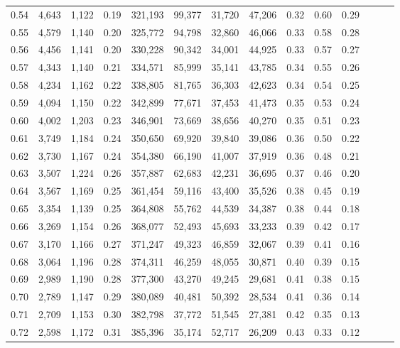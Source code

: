 \begin{tabular}{rrrrrrrrrrrrrr}
0.54 &  4,643 &  1,122 &  0.19 &  321,193 &   99,377 &  31,720 &  47,206 &  0.32 &  0.60 &      0.29 \\
0.55 &  4,579 &  1,140 &  0.20 &  325,772 &   94,798 &  32,860 &  46,066 &  0.33 &  0.58 &      0.28 \\
0.56 &  4,456 &  1,141 &  0.20 &  330,228 &   90,342 &  34,001 &  44,925 &  0.33 &  0.57 &      0.27 \\
0.57 &  4,343 &  1,140 &  0.21 &  334,571 &   85,999 &  35,141 &  43,785 &  0.34 &  0.55 &      0.26 \\
0.58 &  4,234 &  1,162 &  0.22 &  338,805 &   81,765 &  36,303 &  42,623 &  0.34 &  0.54 &      0.25 \\
0.59 &  4,094 &  1,150 &  0.22 &  342,899 &   77,671 &  37,453 &  41,473 &  0.35 &  0.53 &      0.24 \\
0.60 &  4,002 &  1,203 &  0.23 &  346,901 &   73,669 &  38,656 &  40,270 &  0.35 &  0.51 &      0.23 \\
0.61 &  3,749 &  1,184 &  0.24 &  350,650 &   69,920 &  39,840 &  39,086 &  0.36 &  0.50 &      0.22 \\
0.62 &  3,730 &  1,167 &  0.24 &  354,380 &   66,190 &  41,007 &  37,919 &  0.36 &  0.48 &      0.21 \\
0.63 &  3,507 &  1,224 &  0.26 &  357,887 &   62,683 &  42,231 &  36,695 &  0.37 &  0.46 &      0.20 \\
0.64 &  3,567 &  1,169 &  0.25 &  361,454 &   59,116 &  43,400 &  35,526 &  0.38 &  0.45 &      0.19 \\
0.65 &  3,354 &  1,139 &  0.25 &  364,808 &   55,762 &  44,539 &  34,387 &  0.38 &  0.44 &      0.18 \\
0.66 &  3,269 &  1,154 &  0.26 &  368,077 &   52,493 &  45,693 &  33,233 &  0.39 &  0.42 &      0.17 \\
0.67 &  3,170 &  1,166 &  0.27 &  371,247 &   49,323 &  46,859 &  32,067 &  0.39 &  0.41 &      0.16 \\
0.68 &  3,064 &  1,196 &  0.28 &  374,311 &   46,259 &  48,055 &  30,871 &  0.40 &  0.39 &      0.15 \\
0.69 &  2,989 &  1,190 &  0.28 &  377,300 &   43,270 &  49,245 &  29,681 &  0.41 &  0.38 &      0.15 \\
0.70 &  2,789 &  1,147 &  0.29 &  380,089 &   40,481 &  50,392 &  28,534 &  0.41 &  0.36 &      0.14 \\
0.71 &  2,709 &  1,153 &  0.30 &  382,798 &   37,772 &  51,545 &  27,381 &  0.42 &  0.35 &      0.13 \\
0.72 &  2,598 &  1,172 &  0.31 &  385,396 &   35,174 &  52,717 &  26,209 &  0.43 &  0.33 &      0.12 \\

\end{tabular}
